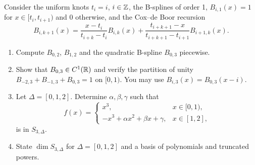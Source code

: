 Consider the uniform knots $t_i=i$, $i\in\mathbb{Z}$, the B-splines of order 1, $B_{i,1}(x)=1$ for $x\in[t_i,t_{i+1})$ and $0$ otherwise, and the Cox--de Boor recursion
\[
B_{i,k+1}(x)=\frac{x-t_i}{t_{i+k}-t_i}B_{i,k}(x)+\frac{t_{i+k+1}-x}{t_{i+k+1}-t_{i+1}}B_{i+1,k}(x).
\]
\begin{enumerate}
\item Compute $B_{0,2}$, $B_{1,2}$ and the quadratic B-spline $B_{0,3}$ piecewise.
\item Show that $B_{0,3}\in C^1(\mathbb{R})$ and verify the partition of unity $B_{-2,3}+B_{-1,3}+B_{0,3}=1$ on $[0,1)$. You may use $B_{i,3}(x)=B_{0,3}(x-i)$.
\item Let $\Delta=[0,1,2]$. Determine $\alpha,\beta,\gamma$ such that
\[
f(x)=\begin{cases}x^3,&x\in[0,1),\\-x^3+\alpha x^2+\beta x+\gamma,&x\in[1,2],\end{cases}
\]
is in $S_{3,\Delta}$.
\item State $\dim S_{3,\Delta}$ for $\Delta=[0,1,2]$ and a basis of polynomials and truncated powers.
\end{enumerate}

